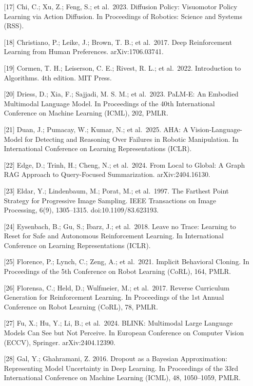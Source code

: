 \documentclass[
  11pt,
]{article}
\begin{document}
{[}17{]} Chi, C.; Xu, Z.; Feng, S.; et al.~2023. Diffusion Policy:
Visuomotor Policy Learning via Action Diffusion. In Proceedings of
Robotics: Science and Systems (RSS).

{[}18{]} Christiano, P.; Leike, J.; Brown, T. B.; et al.~2017. Deep
Reinforcement Learning from Human Preferences. arXiv:1706.03741.

{[}19{]} Cormen, T. H.; Leiserson, C. E.; Rivest, R. L.; et al.~2022.
Introduction to Algorithms. 4th edition. MIT Press.

{[}20{]} Driess, D.; Xia, F.; Sajjadi, M. S. M.; et al.~2023. PaLM-E: An
Embodied Multimodal Language Model. In Proceedings of the 40th
International Conference on Machine Learning (ICML), 202, PMLR.

{[}21{]} Duan, J.; Pumacay, W.; Kumar, N.; et al.~2025. AHA: A
Vision-Language-Model for Detecting and Reasoning Over Failures in
Robotic Manipulation. In International Conference on Learning
Representations (ICLR).

{[}22{]} Edge, D.; Trinh, H.; Cheng, N.; et al.~2024. From Local to
Global: A Graph RAG Approach to Query-Focused Summarization.
arXiv:2404.16130.

{[}23{]} Eldar, Y.; Lindenbaum, M.; Porat, M.; et al.~1997. The Farthest
Point Strategy for Progressive Image Sampling. IEEE Transactions on
Image Processing, 6(9), 1305--1315. doi:10.1109/83.623193.

{[}24{]} Eysenbach, B.; Gu, S.; Ibarz, J.; et al.~2018. Leave no Trace:
Learning to Reset for Safe and Autonomous Reinforcement Learning. In
International Conference on Learning Representations (ICLR).

{[}25{]} Florence, P.; Lynch, C.; Zeng, A.; et al.~2021. Implicit
Behavioral Cloning. In Proceedings of the 5th Conference on Robot
Learning (CoRL), 164, PMLR.

{[}26{]} Florensa, C.; Held, D.; Wulfmeier, M.; et al.~2017. Reverse
Curriculum Generation for Reinforcement Learning. In Proceedings of the
1st Annual Conference on Robot Learning (CoRL), 78, PMLR.

{[}27{]} Fu, X.; Hu, Y.; Li, B.; et al.~2024. BLINK: Multimodal Large
Language Models Can See but Not Perceive. In European Conference on
Computer Vision (ECCV), Springer. arXiv:2404.12390.

{[}28{]} Gal, Y.; Ghahramani, Z. 2016. Dropout as a Bayesian
Approximation: Representing Model Uncertainty in Deep Learning. In
Proceedings of the 33rd International Conference on Machine Learning
(ICML), 48, 1050--1059, PMLR.
\end{document}
